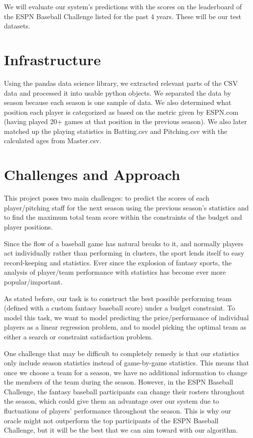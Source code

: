 \documentclass[12pt]{amsart}
\begin{document}
We will evaluate our system's predictions with the scores on the leaderboard of the ESPN Baseball Challenge listed for the past 4 years. These will be our test datasets.

\section{\large Infrastructure}
Using the pandas data science library, we extracted relevant parts of the CSV data and processed it into usable python objects. We separated the data by season because each season is one sample of data. We also determined what position each player is categorized as based on the metric given by ESPN.com (having played 20+ games at that position in the previous season). We also later matched up the playing statistics in Batting.csv and Pitching.csv with the calculated ages from Master.csv.

\section{\large Challenges and Approach}
This project poses two main challenges: to predict the scores of each player/pitching staff for the next season using the previous season's statistics and to find the maximum total team score within the constraints of the budget and player positions.
\vspace{.4cm}

Since the flow of a baseball game has natural breaks to it, and normally players act individually rather than performing in clusters, the sport lends itself to easy record-keeping and statistics. Ever since the explosion of fantasy sports, the analysis of player/team performance with statistics has become ever more popular/important. 
\vspace{.4cm}

As stated before, our task is to construct the best possible performing team (defined with a custom fantasy baseball score) under a budget constraint. To model this task, we want to model predicting the price/performance of individual players as a linear regression problem, and to model picking the optimal team as either a search or constraint satisfaction problem.
\vspace{.4cm}

One challenge that may be difficult to completely remedy is that our statistics only include season statistics instead of game-by-game statistics. This means that once we choose a team for a season, we have no additional information to change the members of the team during the season. However, in the ESPN Baseball Challenge, the fantasy baseball participants can change their rosters throughout the season, which could give them an advantage over our system due to fluctuations of players' performance throughout the season. This is why our oracle might not outperform the top participants of the ESPN Baseball Challenge, but it will be the best that we can aim toward with our algorithm.
\end{document}
